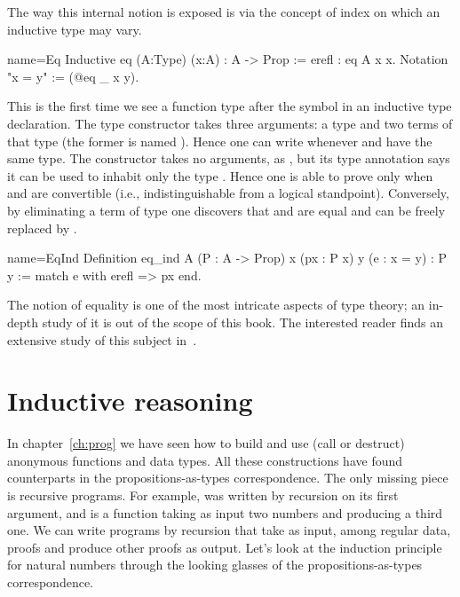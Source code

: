The way this internal notion is exposed is via the concept of index
on which an inductive type may vary.

\begin{coq}{name=Eq}{}
Inductive eq (A:Type) (x:A) : A -> Prop := erefl : eq A x x.
Notation "x = y" := (@eq _ x y).
\end{coq}

This is the first time we see a function type after the \C{:} symbol
in an inductive type declaration.
The  type constructor takes three arguments: a type  and
two terms of that type (the former is named ).
Hence one can write  whenever  and 
have the same type.
The  constructor takes no arguments, as , but its type
annotation says it can be used to inhabit only the type .
Hence one is able to prove  only when  and  are
convertible
(i.e., indistinguishable from a logical standpoint).
Conversely, by eliminating a term
of type  one discovers that   and  are
equal and  can be freely replaced by .

\begin{coq}{name=EqInd}{}
Definition eq_ind A (P : A -> Prop) x (px : P x) y (e : x = y) : P y :=
  match e with erefl => px end.
\end{coq}

The notion of equality is one of the most intricate aspects of type
theory; an in-depth study of it is out of the scope of this book.  The interested reader
finds an extensive study of this subject in~\cite{hottbook}.  %


\section{Inductive reasoning}\label{ssec:indreason}

In chapter~\ref{ch:prog} we have seen how to build and use (call or destruct)
anonymous functions and data types.  All these
constructions have found counterparts in the propositions-as-types correspondence.
The only missing piece is recursive programs.  For example,
 was written by recursion on its first argument, and is a
function taking as input two numbers and producing a third one.
We can write programs by recursion that take as input, among regular  data,
proofs and produce  other proofs as output.  Let's look at the
induction principle for natural numbers through the looking glasses
 of the
propositions-as-types correspondence.

